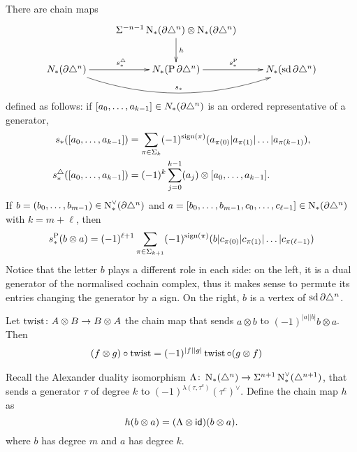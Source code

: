 There are chain maps
\[
\xymatrix{
	&\susp{-n-1}\chains(\partial\simplex^n)\otimes \chains(\partial\simplex^n)\ar[d]^h& \\
	\cadenas(\partial\simplex^n)\ar[r]^{s_*^{\simplex}}\ar@/_2.0pc/[rr]^{s_*} & \cadenas(\Psd \partial\simplex^n)\ar[r]^{s^{\Psd}_*} & \cadenas(\sd\partial\simplex^n)
}
\]
defined as follows: if $[a_0,\ldots,a_{k-1}]\in N_{*}(\partial\triangle^n)$ is an ordered representative of a generator,
\begin{align*}
s_*([a_0,\ldots,a_{k-1}]) &= \sum_{\pi\in \Sigma_{k}} (-1)^{\operatorname{sign}(\pi)}(a_{\pi(0)}|a_{\pi(1)}|\ldots|a_{\pi(k-1)}),
\\
s_*^{\triangle}([a_0,\ldots,a_{k-1}]) &= (-1)^{k}\sum_{j=0}^{k-1} (a_j)\otimes [a_0,\ldots,a_{k-1}].
\end{align*}
If $b = (b_0,\ldots,b_{m-1})\in \operatorname{N}^\vee_{*}(\partial\triangle^n)$ and $a = [b_0,\ldots,b_{m-1},c_0,\ldots,c_{\ell-1}]\in \operatorname{N}_{*}(\partial\triangle^n)$ with $k = m+\ell$, then
\begin{equation}\label{eq:sP}
s_*^{\operatorname{P}}(b\otimes a) = (-1)^{\ell+1}\sum_{\pi\in \Sigma_{k+1}} (-1)^{\operatorname{sign}(\pi)} (b|c_{\pi(0)}|c_{\pi(1)}|\ldots|c_{\pi(\ell-1)})
\end{equation}
Notice that the letter $b$ plays a different role in each side: on the left, it is a dual generator of the normalised cochain complex, thus it makes sense to permute its entries changing the generator by a sign. On the right, $b$ is a vertex of $\operatorname{sd}\partial\triangle^n$. 




\begin{remark}
Let $\operatorname{twist}\colon A\otimes B\to B\otimes A$ the chain map that sends $a\otimes b$ to $(-1)^{|a||b|}b\otimes a$. Then
	\begin{align*}
		(f\otimes g)\circ \operatorname{twist} &= (-1)^{|f||g|}\operatorname{twist} \circ (g\otimes f)
	\end{align*}
\end{remark}

Recall the Alexander duality isomorphism $\Lambda\colon \operatorname{N}_{*}(\triangle^n)\to \Sigma^{n+1}\operatorname{N}^\vee_{*}(\triangle^{n+1})$, that sends a generator $\tau$ of degree $k$ to $(-1)^{\lambda(\tau,\tau^c)} (\tau^c)^{\vee}$. Define the chain map $h$ as
\[
h( b\otimes a) = (\Lambda\otimes \mathsf{id})(b\otimes a).
\]
where $b$ has degree $m$ and $a$ has degree $k$.

